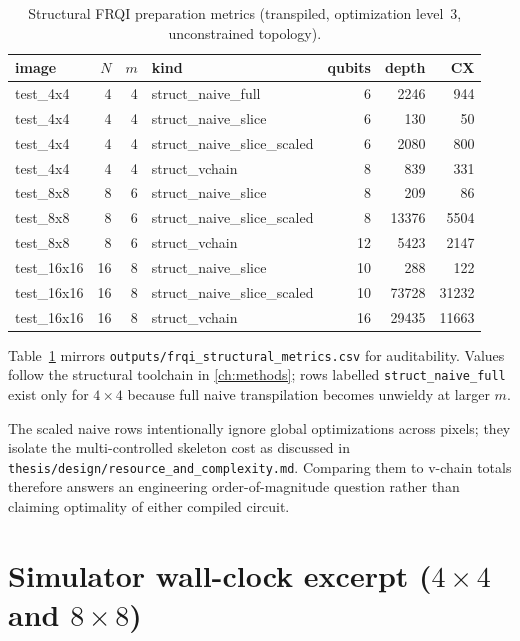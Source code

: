 \begin{table}[htbp]
\centering
\caption{Structural FRQI preparation metrics (transpiled, optimization level~3, unconstrained topology).}
\label{tab:struct-csv}
\scriptsize
\begin{tabular}{@{}lrrlrrr@{}}
\toprule
image & $N$ & $m$ & kind & qubits & depth & CX \\
\midrule
test\_4x4 & 4 & 4 & struct\_naive\_full & 6 & 2246 & 944 \\
test\_4x4 & 4 & 4 & struct\_naive\_slice & 6 & 130 & 50 \\
test\_4x4 & 4 & 4 & struct\_naive\_slice\_scaled & 6 & 2080 & 800 \\
test\_4x4 & 4 & 4 & struct\_vchain & 8 & 839 & 331 \\
test\_8x8 & 8 & 6 & struct\_naive\_slice & 8 & 209 & 86 \\
test\_8x8 & 8 & 6 & struct\_naive\_slice\_scaled & 8 & 13376 & 5504 \\
test\_8x8 & 8 & 6 & struct\_vchain & 12 & 5423 & 2147 \\
test\_16x16 & 16 & 8 & struct\_naive\_slice & 10 & 288 & 122 \\
test\_16x16 & 16 & 8 & struct\_naive\_slice\_scaled & 10 & 73728 & 31232 \\
test\_16x16 & 16 & 8 & struct\_vchain & 16 & 29435 & 11663 \\
\bottomrule
\end{tabular}
\end{table}

Table~\ref{tab:struct-csv} mirrors \texttt{outputs/frqi\_structural\_metrics.csv} for auditability. Values follow the structural toolchain in \cref{ch:methods}; rows labelled \texttt{struct\_naive\_full} exist only for $4\times 4$ because full naive transpilation becomes unwieldy at larger $m$.

The scaled naive rows intentionally ignore global optimizations across pixels; they isolate the multi-controlled skeleton cost as discussed in \texttt{thesis/design/resource\_and\_complexity.md}. Comparing them to v-chain totals therefore answers an engineering order-of-magnitude question rather than claiming optimality of either compiled circuit.

\chapter{Simulator wall-clock excerpt \texorpdfstring{($4\times4$ and $8\times8$)}{(4x4 and 8x8)}}

